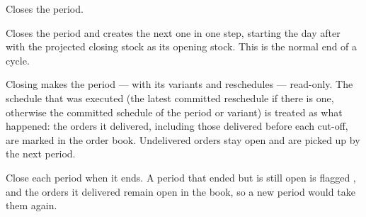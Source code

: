 \begin{description}[style=nextline, leftmargin=1.2em, font=\bfseries\color{brand}]
  \item[Close only] Closes the period.
  \item[Close \& start the next period] Closes the period and creates the next one in one step, starting the
        day after with the projected closing stock as its opening stock. This is the normal end of a cycle.
\end{description}

Closing makes the period --- with its variants and reschedules --- read-only. The schedule that was executed
(the latest committed reschedule if there is one, otherwise the committed schedule of the period or variant)
is treated as what happened: the orders it delivered, including those delivered before each cut-off, are
marked  in the order book. Undelivered orders stay open and are picked up by the next period.


\begin{warning}
Close each period when it ends. A period that ended but is still open is flagged , and the
orders it delivered remain open in the book, so a new period would take them again.
\end{warning}
